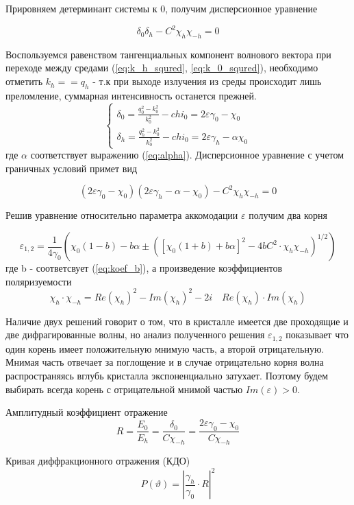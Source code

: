 Прировняем детерминант системы к 0, получим дисперсионное уравнение

\begin{equation}
   \delta_0 \delta_h -C^2 \chi_h \chi_{-h} = 0
\end{equation}

Воспользуемся равенством тангенциальных компонент волнового вектора при переходе между средами (\ref{eq:k_h_squred}, \ref{eq:k_0_squred}),
необходимо отметить $k_h == q_h$ - т.к при выходе излучения из среды происходит лишь преломление, суммарная интенсивность останется прежней.
\begin{equation}
 \begin{cases}
   \delta_0 = \frac{q_0^2 - k_0^2}{k_0^2} - chi_0 = 2\varepsilon\gamma_0 - \chi_0
   \\
   \delta_h = \frac{q_h^2 - k_0^2}{k_0^2} - chi_0 = 2\varepsilon\gamma_h - \alpha \chi_0
 \end{cases}
\end{equation}
где $\alpha$ соответствует выражению (\ref{eq:alpha}). Дисперсионное уравнение с учетом граничных условий примет вид

\begin{equation}
   (2\varepsilon \gamma_0 - \chi_0)(2\varepsilon \gamma_h - \alpha - \chi_0) - C^2 \chi_h\chi_{-h} = 0
\end{equation}

Решив уравнение относительно параметра аккомодации $\varepsilon$ получим два корня

\begin{equation}
   \varepsilon_{1,2} = \frac{1}{4\gamma_0} \left( \chi_0 (1-b) - b\alpha \pm \left( [\chi_0(1+b)+b\alpha]^2 - 4bC^2 \cdot \chi_{h}\chi_{-h} \right)^{1/2} \right)
\end{equation}
где b - соответсвует (\ref{eq:koef_b}),  а произведение коэффициентов поляризуемости
 $$\chi_{h} \cdot \chi_{-h} = Re(\chi_{h})^2-Im(\chi_{h})^2 - 2i \quad Re(\chi_{h}) \cdot Im(\chi_{h})$$

Наличие двух решений говорит о том, что в кристалле имеется две проходящие и две дифрагированные волны, но
анализ полученного решения $ \varepsilon_{1,2}$ показывает что один корень имеет положительную мнимую часть, а второй
отрицательную. Мнимая часть отвечает за поглощение и в случае отрицательно корня волна распространяясь
вглубь кристалла экспоненциально затухает. Поэтому будем выбирать всегда корень с отрицательной мнимой частью
$Im(\varepsilon)>0$.

Амплитудный коэффициент отражение
\begin{equation}
    R = \frac{E_0}{E_h} = \frac{\delta_0}{C\chi_{-h}} = \frac{2\varepsilon\gamma_0-\chi_0}{C\chi_{-h}}
\end{equation}

Кривая диффракционного отражения (КДО) \cite{Bushuev_Oreshko_2002}
\begin{equation}
    \label{eq:KDO_self}
    P (\vartheta) =  |\frac{\gamma_h}{\gamma_0} \cdot R|^2
\end{equation}
